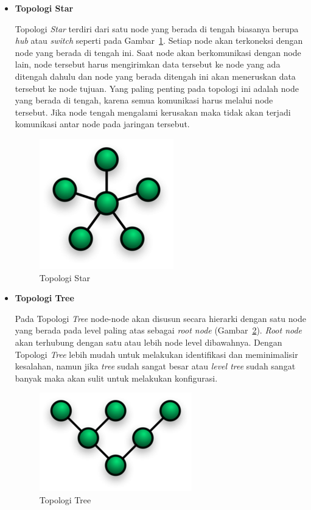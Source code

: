 \documentclass[a4paper,twoside]{article}
\begin{document}
\begin{enumerate}
\begin{itemize}
\item \textbf{Topologi Star}

Topologi \textit{Star} terdiri dari satu node yang berada di tengah biasanya berupa \textit{hub} atau \textit{switch} seperti pada Gambar~\ref{fig:star}. Setiap node akan terkoneksi dengan node yang berada di tengah ini. Saat node akan berkomunikasi dengan node lain, node tersebut harus mengirimkan data tersebut ke node yang ada ditengah dahulu dan node yang berada ditengah ini akan meneruskan data tersebut ke node tujuan. Yang paling penting pada topologi ini adalah node yang berada di tengah, karena semua komunikasi harus melalui node tersebut. Jika node tengah mengalami kerusakan maka tidak akan terjadi komunikasi antar node pada jaringan tersebut.
\begin{figure} [H]
	\centering  
	\includegraphics[scale=0.3]{Gambar/star}  
	\caption[Topologi Star]{Topologi Star} 
	\label{fig:star} 
\end{figure} 

\item \textbf{Topologi Tree}

Pada Topologi \textit{Tree} node-node akan disusun secara hierarki dengan satu node yang berada pada level paling atas sebagai \textit{root node} (Gambar~\ref{fig:tree}). \textit{Root node} akan terhubung dengan satu atau lebih node level dibawahnya. Dengan Topologi \textit{Tree} lebih mudah untuk melakukan identifikasi dan meminimalisir kesalahan, namun jika \textit{tree} sudah sangat besar atau \textit{level tree} sudah sangat banyak maka akan sulit untuk melakukan konfigurasi.
\begin{figure} [H]
	\centering  
	\includegraphics[scale=0.3]{Gambar/tree}  
	\caption[Topologi Tree]{Topologi Tree} 
	\label{fig:tree} 
\end{figure} 


\end{itemize}
\end{enumerate}
\end{document}

